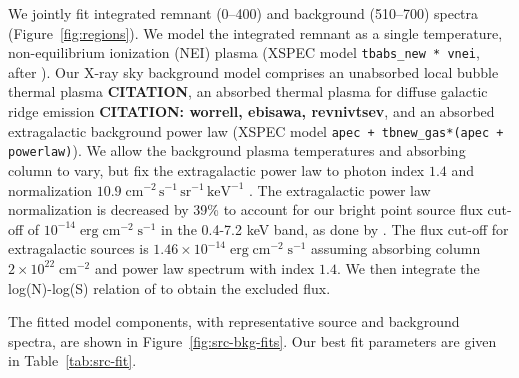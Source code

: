 \documentclass[preprint2,tighten,trackchanges]{aastex6}
\newcommand*{\mt}{\mathrm}
\newcommand*{\unit}[1]{\;\mt{#1}}  %
\newcommand*{\nHUnits}{\times 10^{22} \unit{cm^{-2}}}
\begin{document}
\begin{figure*}[]
    \label{fig:regions}
\end{figure*}

We jointly fit integrated remnant (0--400\arcsec) and background
(510--700\arcsec) spectra (Figure~\ref{fig:regions}).
We model the integrated remnant as a single temperature, non-equilibrium
ionization (NEI) plasma (XSPEC model \texttt{tbabs\_new * vnei}, after
\citet{hamilton1983}).  %
Our X-ray sky background model comprises an unabsorbed local bubble thermal
plasma \textbf{CITATION}, an absorbed thermal plasma for diffuse galactic ridge
emission \textbf{CITATION: worrell, ebisawa, revnivtsev}, and an absorbed extragalactic background power law
(XSPEC model \texttt{apec + tbnew\_gas*(apec + powerlaw)}).
We allow the background plasma temperatures and absorbing column to vary, but
fix the extragalactic power law to photon index $1.4$ and normalization
$10.9 \unit{cm^{-2}\, s^{-1}\, sr^{-1}\, keV^{-1}}$ \citep{hickox2006}.
The extragalactic power law normalization is decreased by 39\% to account for
our bright point source flux cut-off of $10^{-14} \unit{erg\;cm^{-2}\;s^{-1}}$
in the 0.4-7.2 keV band, as done by \citet{revnivtsev2009}.
The flux cut-off for extragalactic sources is
$1.46 \times 10^{-14} \unit{erg\;cm^{-2}\;s^{-1}}$ assuming
absorbing column $2 \nHUnits$ and power law spectrum with index $1.4$.
We then integrate the log(N)-log(S) relation of \citet{moretti2003} to obtain
the excluded flux.

The fitted model components, with representative source and background spectra,
are shown in Figure~\ref{fig:src-bkg-fits}.
Our best fit parameters are given in Table~\ref{tab:src-fit}.

\begin{figure*}[!ht]
    \label{fig:src-bkg-fits}
\end{figure*}
\end{document}
